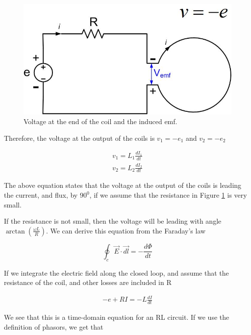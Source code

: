 \documentclass{ximera}
\begin{document}
\begin{figure}[htbp]
\begin{center}
\includegraphics[scale=0.5]{../jpg/Loop_Inductance.jpg}
\end{center}
\caption{Voltage at the end of the coil and the induced emf.}
\label{fig:InducedEMF}
\end{figure}


 Therefore,
the voltage at the output of the coils is $v_1=-e_1$ and $v_2=-e_2$

\begin{eqnarray}
v_1= L_1 \frac{dI_1}{dt} \\
v_2= L_2 \frac{dI_2}{dt}
\end{eqnarray}



The above equation states that the voltage at the output of the coils is leading the current, and flux, by $90^0$, if we assume that the resistance in Figure \ref{fig:InducedEMF} is very small.


 If the resistance is not small, then the voltage will be leading with angle $\arctan(\frac{\omega L}{R})$. We can derive this equation from the Faraday's law
 
 

\begin{equation}
\oint_c \vec{E} \cdot \vec{dl} =  - \frac{d\Phi}{dt}
\end{equation}

If we integrate the electric field along the closed loop, and assume that the resistance of the coil, and other losses are included in R

\begin{eqnarray}
-e + R I = - L \frac{d I}{dt}
\end{eqnarray}

We see that this is a time-domain equation for an RL circuit. If we use the definition of phasors, we get that
\end{document}
